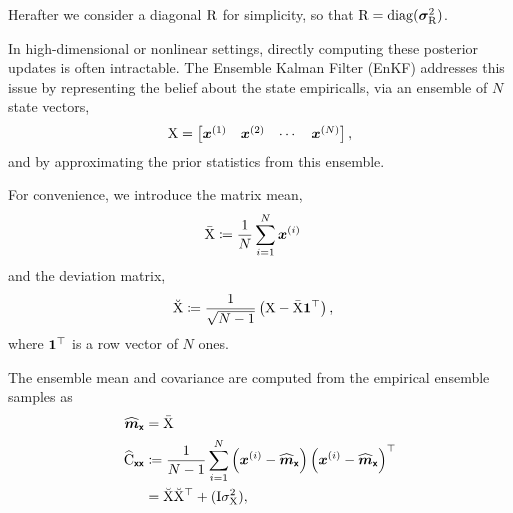 \documentclass{article}
\begin{document}
Herafter we consider a diagonal \(\mathrm{R}\) for simplicity, so that \(\mathrm{R}=\operatorname{diag}(\boldsymbol{\sigma}_{\mathrm{R}}^2)\).

In high-dimensional or nonlinear settings, directly computing these posterior updates is often intractable.
The Ensemble Kalman Filter (EnKF) addresses this issue by representing the belief about the state empiricalls,  via an ensemble of \(N\) state vectors,
\[
\mathrm{X} = \begin{bmatrix} \boldsymbol{x}^{(1)} & \boldsymbol{x}^{(2)} & \cdots & \boldsymbol{x}^{(N)} \end{bmatrix},
\]
and by approximating the prior statistics from this ensemble.

For convenience, we introduce the  matrix mean,
\begin{align}
\bar{\mathrm{X}} &\coloneq \frac{1}{N}\sum_{i=1}^N \boldsymbol{x}^{(i)}
\end{align}
and the deviation matrix,
\begin{align}
\breve{\mathrm{X}} &\coloneq \frac{1}{\sqrt{N-1}} \left( \mathrm{X} - \bar{\mathrm{X}} \boldsymbol{1}^\top \right), \label{eq:deviation_matrix}
\end{align}
where \(\boldsymbol{1}^\top\) is a row vector of \(N\) ones.

The ensemble mean and covariance are computed from the empirical ensemble samples as
\begin{align}
\widehat{\boldsymbol{m}}_{\boldsymbol{\mathsf{x}}}
&=\bar{\mathrm{X}}\\
\widehat{\mathrm{C}}_{\boldsymbol{\mathsf{xx}}} &\coloneq \frac{1}{N-1} \sum_{i=1}^{N} \left(\boldsymbol{x}^{(i)} - \widehat{\boldsymbol{m}}_{\boldsymbol{\mathsf{x}}}\right)\left(\boldsymbol{x}^{(i)} - \widehat{\boldsymbol{m}}_{\boldsymbol{\mathsf{x}}}\right)^\top\\
&=\breve{\mathrm{X}} \breve{\mathrm{X}}^\top + (\mathrm{I}\sigma^2_{\mathrm{X}}),\label{eq:ensemble-covariance}
\end{align}
\end{document}
